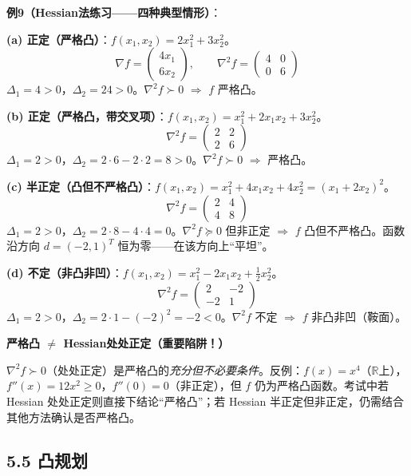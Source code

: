 \textbf{例9（Hessian法练习——四种典型情形）}：

\textbf{(a) 正定（严格凸）}：$f(x_1,x_2) = 2x_1^2 + 3x_2^2$。
\[
\nabla f = \begin{pmatrix}4x_1 \\ 6x_2\end{pmatrix},\qquad
\nabla^2 f = \begin{pmatrix}4 & 0 \\ 0 & 6\end{pmatrix}
\]
$\Delta_1 = 4 > 0$，$\Delta_2 = 24 > 0$。$\nabla^2 f \succ 0$ $\Rightarrow$ $f$ 严格凸。

\textbf{(b) 正定（严格凸，带交叉项）}：$f(x_1,x_2) = x_1^2 + 2x_1x_2 + 3x_2^2$。
\[
\nabla^2 f = \begin{pmatrix}2 & 2 \\ 2 & 6\end{pmatrix}
\]
$\Delta_1 = 2 > 0$，$\Delta_2 = 2\cdot6-2\cdot2 = 8 > 0$。$\nabla^2 f \succ 0$ $\Rightarrow$ 严格凸。

\textbf{(c) 半正定（凸但不严格凸）}：$f(x_1,x_2) = x_1^2 + 4x_1x_2 + 4x_2^2 = (x_1+2x_2)^2$。
\[
\nabla^2 f = \begin{pmatrix}2 & 4 \\ 4 & 8\end{pmatrix}
\]
$\Delta_1 = 2 > 0$，$\Delta_2 = 2\cdot8-4\cdot4 = 0$。$\nabla^2 f \succeq 0$ 但非正定 $\Rightarrow$ $f$ 凸但不严格凸。函数沿方向 $d=(-2,1)^T$ 恒为零——在该方向上“平坦”。

\textbf{(d) 不定（非凸非凹）}：$f(x_1,x_2) = x_1^2 - 2x_1x_2 + \frac12 x_2^2$。
\[
\nabla^2 f = \begin{pmatrix}2 & -2 \\ -2 & 1\end{pmatrix}
\]
$\Delta_1 = 2 > 0$，$\Delta_2 = 2\cdot1-(-2)^2 = -2 < 0$。$\nabla^2 f$ 不定 $\Rightarrow$ $f$ 非凸非凹（鞍面）。

\begin{notebox}
\textbf{严格凸 $\neq$ Hessian处处正定（重要陷阱！）}

$\nabla^2 f \succ 0$（处处正定）是严格凸的\emph{充分但不必要条件}。反例：$f(x)=x^4$（$\mathbb{R}$上），$f''(x)=12x^2 \ge 0$，$f''(0)=0$（非正定），但 $f$ 仍为严格凸函数。考试中若 Hessian 处处正定则直接下结论“严格凸”；若 Hessian 半正定但非正定，仍需结合其他方法确认是否严格凸。
\end{notebox}

\subsection{5.5 凸规划}

